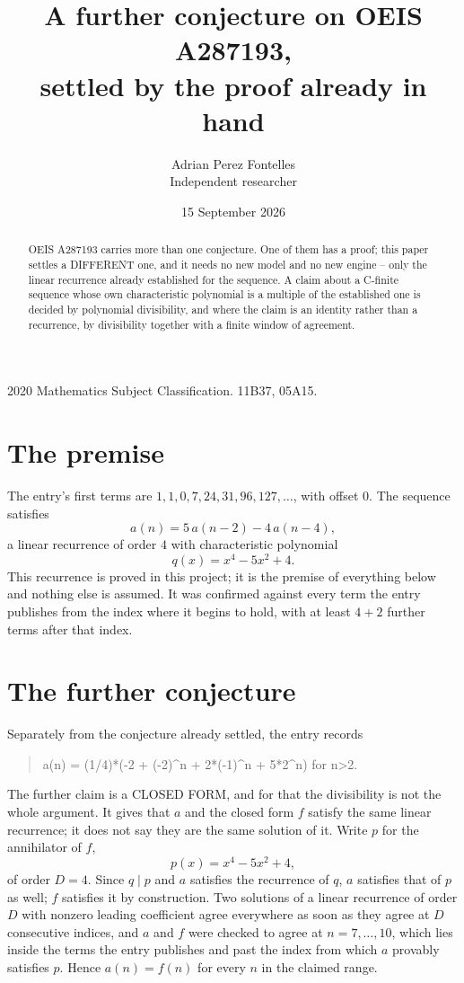 \documentclass[11pt,a4paper]{article}
\title{A further conjecture on OEIS A287193,\\ \large settled by the proof already in hand}
\author{Adrian Perez Fontelles\\ \small Independent researcher}
\date{15 September 2026}
\theoremstyle{plain}
\theoremstyle{definition}
\begin{document}
\maketitle

\begin{abstract}
OEIS A287193 carries more than one conjecture. One of them has a proof; this paper settles a
DIFFERENT one, and it needs no new model and no new engine -- only the linear recurrence already
established for the sequence. A claim about a C-finite sequence whose own characteristic
polynomial is a multiple of the established one is decided by polynomial divisibility, and where
the claim is an identity rather than a recurrence, by divisibility together with a finite window
of agreement.
\end{abstract}

\noindent\small 2020 Mathematics Subject Classification. 11B37, 05A15.\normalsize

\section{The premise}

The entry's first terms are $1, 1, 0, 7, 24, 31, 96, 127,\dots$, with offset $0$. The sequence satisfies
\[
  a(n)=5\,a(n-2) - 4\,a(n-4) ,
\]
a linear recurrence of order $4$ with characteristic polynomial
\[
  q(x)=x^{4} - 5 x^{2} + 4 .
\]
This recurrence is proved in this project; it is the premise of everything below and nothing else is assumed.
It was confirmed against every term the entry publishes from the index where it begins to hold,
with at least $4+2$ further terms after that index.

\section{The further conjecture}

Separately from the conjecture already settled, the entry records

\begin{quote}\raggedright a(n) = (1/4)*(-2 + (-2)\^{}n + 2*(-1)\^{}n + 5*2\^{}n) for n>2.\end{quote}

The further claim is a CLOSED FORM, and for that the divisibility is not the whole argument. It
gives that $a$ and the closed form $f$ satisfy the same linear recurrence; it does not say they
are the same solution of it. Write $p$ for the annihilator of $f$,
\[
  p(x)=x^{4} - 5 x^{2} + 4 ,
\]
of order $D=4$. Since $q\mid p$ and $a$ satisfies the recurrence of $q$, $a$ satisfies that of
$p$ as well; $f$ satisfies it by construction. Two solutions of a linear recurrence of order $D$
with nonzero leading coefficient agree everywhere as soon as they agree at $D$ consecutive
indices, and $a$ and $f$ were checked to agree at $n=7,\dots,10$,
which lies inside the terms the entry publishes and past the index from which $a$ provably
satisfies $p$. Hence $a(n)=f(n)$ for every $n$ in the claimed range.
\end{document}
